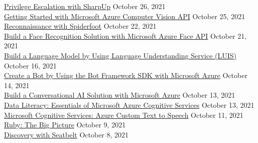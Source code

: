 \documentclass[10pt]{res} %
\begin{document}
\begin{resume}
\href{https://bjdelacruz.dev/files/certificates/pluralsight/28_Privilege_Escalation_with_SharpUp.pdf}{\color{blue}Privilege Escalation with SharpUp} \hfill October 26, 2021 \\
\href{https://bjdelacruz.dev/files/certificates/pluralsight/2_Getting_Started_with_Microsoft_Azure_Computer_Vision_API.pdf}{\color{blue}Getting Started with Microsoft Azure Computer Vision API} \hfill October 25, 2021 \\
\href{https://bjdelacruz.dev/files/certificates/pluralsight/10_Reconnaissance_with_Spiderfoot.pdf}{\color{blue}Reconnaissance with Spiderfoot} \hfill October 22, 2021 \\
\href{https://bjdelacruz.dev/files/certificates/pluralsight/4_Build_a_Face_Recognition_Solution_with_Microsoft_Azure_Face_API.pdf}{\color{blue}Build a Face Recognition Solution with Microsoft Azure Face API} \hfill October 21, 2021 \\
\href{https://bjdelacruz.dev/files/certificates/pluralsight/10_Build_a_Language_Model_by_Using_Language_Understanding_Service_LUIS.pdf}{\color{blue}Build a Language Model by Using Language Understanding Service (LUIS)} \hfill October 16, 2021 \\
\href{https://bjdelacruz.dev/files/certificates/pluralsight/13_Create_a_Bot_by_Using_the_Bot_Framework_SDK_with_Microsoft_Azure.pdf}{\color{blue}Create a Bot by Using the Bot Framework SDK with Microsoft Azure} \hfill October 14, 2021 \\
\href{https://bjdelacruz.dev/files/certificates/pluralsight/12_Build_a_Conversational_AI_Solution_with_Microsoft_Azure.pdf}{\color{blue}Build a Conversational AI Solution with Microsoft Azure} \hfill October 13, 2021 \\
\href{https://bjdelacruz.dev/files/certificates/pluralsight/1_Data_Literacy_Essentials_of_Microsoft_Azure_Cognitive_Services.pdf}{\color{blue}Data Literacy: Essentials of Microsoft Azure Cognitive Services} \hfill October 13, 2021 \\
\href{https://bjdelacruz.dev/files/certificates/pluralsight/Microsoft_Cognitive_Services_Azure_Custom_Text_to_Speech.pdf}{\color{blue}Microsoft Cognitive Services: Azure Custom Text to Speech} \hfill October 11, 2021 \\
\href{https://bjdelacruz.dev/files/certificates/pluralsight/Ruby_The_Big_Picture.pdf}{\color{blue}Ruby: The Big Picture} \hfill October 9, 2021 \\
\href{https://bjdelacruz.dev/files/certificates/pluralsight/42_Discovery_with_Seatbelt.pdf}{\color{blue}Discovery with Seatbelt} \hfill October 8, 2021 \\

\end{resume}
\end{document}
